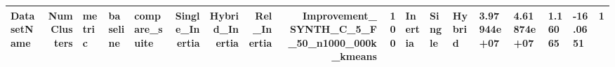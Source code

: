 \begin{tabular}{lrlllrrrrr}
\toprule
DatasetName & NumClusters & metric & baseline & compare_suite & Single_Inertia & Hybrid_Inertia & Rel_Inertia & Improvement_%
\midrule
SYNTH_C_5_F_50_n1000_000k_kmeans & 100 & Inertia & Single & Hybrid & 3.97944e+07 & 4.61874e+07 & 1.16065 & -16.0651 & 1 \\
\bottomrule
\end{tabular}
